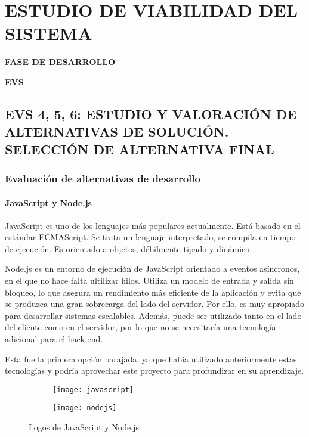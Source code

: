 \newpage
\chapter{ESTUDIO DE VIABILIDAD DEL SISTEMA}
	\vspace{2cm}	
	\begin{center}
	{\Large \textbf{FASE DE DESARROLLO} \par}
	\end{center}
	\vspace{5cm}
	
	\begin{center}
	\Huge \textbf{EVS}\par
	\end{center}\newpage
\section{EVS 4, 5, 6: ESTUDIO Y VALORACIÓN DE ALTERNATIVAS DE SOLUCIÓN. SELECCIÓN DE ALTERNATIVA FINAL}

\subsection{Evaluación de alternativas de desarrollo} 
\subsubsection{JavaScript y Node.js}
JavaScript es uno de los lenguajes más populares actualmente. Está basado en el estándar ECMAScript. Se trata un lenguaje interpretado, se compila en tiempo de ejecución. Es orientado a objetos, débilmente tipado y dinámico\cite{JavaScript}. 
\par Node.js es un entorno de ejecución de JavaScript orientado a eventos asíncronos, en el que no hace falta ultilizar hilos. Utiliza un modelo de entrada y salida sin bloqueo, lo que asegura un rendimiento más eficiente de la aplicación y evita que se produzca una gran sobrecarga del lado del servidor. Por ello, es muy apropiado para desarrollar sistemas escalables\cite{NodeJS}. Además, puede ser utilizado tanto en el lado del cliente como en el servidor, por lo que no se necesitaría una tecnología adicional para el back-end.
\par Esta fue la primera opción barajada, ya que había utilizado anteriormente estas tecnologías y podría aprovechar este proyecto para profundizar en su aprendizaje.
\begin{figure}[H]
	\centering
	\begin{subfigure}{0.3\textwidth}
	\centering
	\texttt{[image: javascript]}
	\end{subfigure}
	\begin{subfigure}{0.3\textwidth}
	\centering
	\texttt{[image: nodejs]}
	\end{subfigure}
	\caption{Logos de JavaScript y Node.js}
\end{figure}

